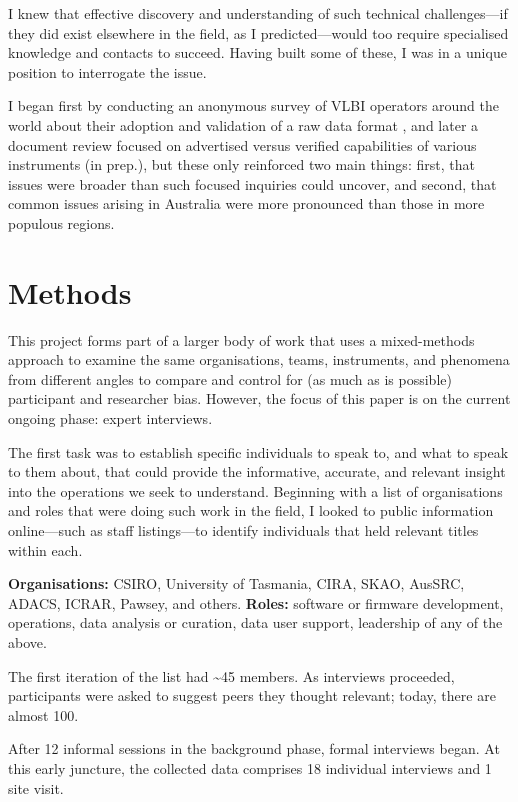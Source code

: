 \documentclass[11pt,twoside]{article}
\begin{document}
I knew that effective discovery and understanding of such technical challenges---if they did exist elsewhere in the field, as I predicted---would too require specialised knowledge and contacts to succeed. Having built some of these, I was in a unique position to interrogate the issue.

I began first by conducting an anonymous survey of VLBI operators around the world about their adoption and validation of a raw data format \citep[see][]{buttfield2022vdif}, and later a document review focused on advertised versus verified capabilities of various instruments (in prep.), but these only reinforced two main things: first, that issues were broader than such focused inquiries could uncover, and second, that common issues arising in Australia were more pronounced than those in more populous regions.

\section{Methods}

This project forms part of a larger body of work that uses a mixed-methods approach to examine the same organisations, teams, instruments, and phenomena from different angles to compare and control for (as much as is possible) participant and researcher bias. However, the focus of this paper is on the current ongoing phase: expert interviews.

The first task was to establish specific individuals to speak to, and what to speak to them about, that could provide the informative, accurate, and relevant insight into the operations we seek to understand. Beginning with a list of organisations and roles that were doing such work in the field, I looked to public information online---such as staff listings---to identify individuals that held relevant titles within each. 

\textbf{Organisations:} CSIRO, University of Tasmania, CIRA, SKAO, AusSRC, ADACS, ICRAR, Pawsey, and others. \textbf{Roles:} software or firmware development, operations, data analysis or curation, data user support, leadership of any of the above.

The first iteration of the list had \textasciitilde45 members. As interviews proceeded, participants were asked to suggest peers they thought relevant; today, there are almost 100.

After 12 informal sessions in the background phase, formal interviews began. At this early juncture, the collected data comprises 18 individual interviews and 1 site visit.
\end{document}
